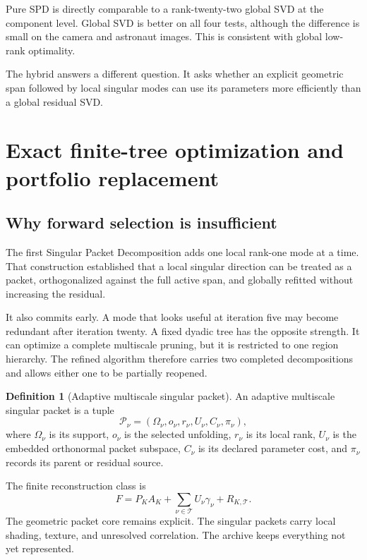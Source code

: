 \documentclass[11pt]{article}
\theoremstyle{definition}
\newtheorem{definition}[theorem]{Definition}
\theoremstyle{remark}
\begin{document}
Pure SPD is directly comparable to a rank-twenty-two global SVD at the component level. Global SVD is better on all four tests, although the difference is small on the camera and astronaut images. This is consistent with global low-rank optimality.

The hybrid answers a different question. It asks whether an explicit geometric span followed by local singular modes can use its parameters more efficiently than a global residual SVD.

\FloatBarrier
\FloatBarrier
\section{Exact finite-tree optimization and portfolio replacement}
\subsection{Why forward selection is insufficient}
The first Singular Packet Decomposition adds one local rank-one mode at a time. That construction established that a local singular direction can be treated as a packet, orthogonalized against the full active span, and globally refitted without increasing the residual.

It also commits early. A mode that looks useful at iteration five may become redundant after iteration twenty. A fixed dyadic tree has the opposite strength. It can optimize a complete multiscale pruning, but it is restricted to one region hierarchy. The refined algorithm therefore carries two completed decompositions and allows either one to be partially reopened.

\begin{definition}[Adaptive multiscale singular packet]
An adaptive multiscale singular packet is a tuple
\[
\mathcal P_\nu=(\Omega_\nu,o_\nu,r_\nu,U_\nu,C_\nu,\pi_\nu),
\]
where $\Omega_\nu$ is its support, $o_\nu$ is the selected unfolding, $r_\nu$ is its local rank, $U_\nu$ is the embedded orthonormal packet subspace, $C_\nu$ is its declared parameter cost, and $\pi_\nu$ records its parent or residual source.
\end{definition}

The finite reconstruction class is
\[
\boxed{
F=P_KA_K+\sum_{\nu\in\mathcal T}U_\nu\gamma_\nu+R_{K,\mathcal T}.
}
\]
The geometric packet core remains explicit. The singular packets carry local shading, texture, and unresolved correlation. The archive keeps everything not yet represented.

\FloatBarrier
\end{document}
